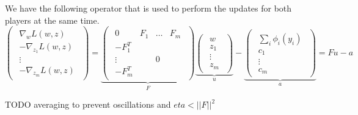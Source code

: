 We have the following operator that is used to perform the updates for
both players at the same time.
\begin{equation}
  \begin{pmatrix}
    \begin{array}{c} \nabla_{ w} {L}( w, z)\\
      -\nabla_{ z_1} {L}( w, z)\\
      \vdots\\
      -\nabla_{ z_m} {L}( w, z)
    \end{array}
  \end{pmatrix} =
  \underbrace{
    \begin{pmatrix}
      \begin{array}{cccc}
        0 &  F_1 & \dots &  F_m\\
        - F_1^T & & &\\
        \vdots & &  0 &\\
        - F_m^T & & &
      \end{array}
    \end{pmatrix}}_{ F}
  \underbrace{
    \begin{pmatrix}
      \begin{array}{c}
         w\\
         z_1\\
        \vdots\\
         z_m
      \end{array}
    \end{pmatrix}}_{ u}-
  \underbrace{
    \begin{pmatrix}
      \begin{array}{c}
        \sum_i  \phi_i( y_i)\\
         c_1\\
        \vdots\\
         c_m
      \end{array}
    \end{pmatrix}}_{ a} =  F  u -  a
  \end{equation}

TODO averaging to prevent oscillations and $eta<||F||^2$


\clearpage
